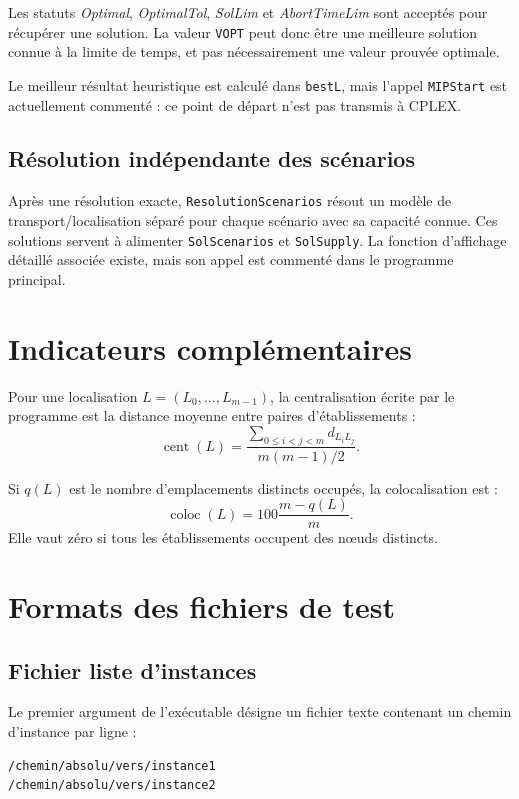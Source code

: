 \documentclass[11pt,a4paper]{article}
\newcommand{\code}[1]{\texttt{#1}}
\begin{document}
Les statuts \emph{Optimal}, \emph{OptimalTol}, \emph{SolLim} et
\emph{AbortTimeLim} sont acceptés pour récupérer une solution. La valeur
\code{VOPT} peut donc être une meilleure solution connue à la limite de temps,
et pas nécessairement une valeur prouvée optimale.

Le meilleur résultat heuristique est calculé dans \code{bestL}, mais l'appel
\code{MIPStart} est actuellement commenté : ce point de départ n'est pas
transmis à CPLEX.

\subsection{Résolution indépendante des scénarios}

Après une résolution exacte, \code{ResolutionScenarios} résout un modèle de
transport/localisation séparé pour chaque scénario avec sa capacité connue.
Ces solutions servent à alimenter \code{SolScenarios} et \code{SolSupply}.
La fonction d'affichage détaillé associée existe, mais son appel est commenté
dans le programme principal.

\section{Indicateurs complémentaires}

Pour une localisation $L=(L_0,\dots,L_{m-1})$, la centralisation écrite par
le programme est la distance moyenne entre paires d'établissements :
\[
\operatorname{cent}(L)
=
\frac{\sum_{0\leq i<j<m}d_{L_iL_j}}
     {m(m-1)/2}.
\]

Si $q(L)$ est le nombre d'emplacements distincts occupés, la colocalisation
est :
\[
\operatorname{coloc}(L)
=
100\frac{m-q(L)}{m}.
\]
Elle vaut zéro si tous les établissements occupent des nœuds distincts.

\section{Formats des fichiers de test}

\subsection{Fichier liste d'instances}

Le premier argument de l'exécutable désigne un fichier texte contenant un
chemin d'instance par ligne :
\begin{lstlisting}
/chemin/absolu/vers/instance1
/chemin/absolu/vers/instance2
\end{lstlisting}
\end{document}
